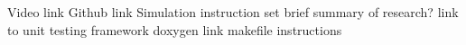 Video link Github link Simulation instruction set brief summary of research? link to unit testing framework doxygen link makefile instructions 